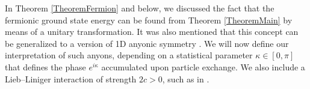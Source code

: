 \documentclass[a4paper,11pt]{article}
\newcommand{\dom}[1]{\mathcal D\left(#1\right)}
\newcommand{\ie}{\emph{i.e.} }
\numberwithin{equation}{section}
\begin{document}

In Theorem \ref{TheoremFermion} and below, we discussed the fact that the fermionic ground state energy can be found from Theorem \ref{TheoremMain} by means of a unitary transformation. It was also mentioned that this concept can be generalized to a version of 1D anyonic symmetry \cite{leinaas1977theory,bonkhoff2021bosonic,posske2017second}. We will now define our interpretation of such anyons, depending on a statistical parameter $\kappa\in[0,\pi]$ that defines the phase $e^{i\kappa}$ accumulated upon particle exchange. We also include a Lieb--Liniger interaction of strength $2c>0$, such as in \cite{kundu1999exact,hao2008ground,batchelor2006one}.
\end{document}
